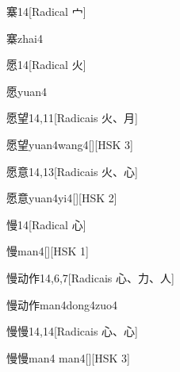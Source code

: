 \begin{entry}{寨}{14}[Radical ⼧]
  \begin{phonetics}{寨}{zhai4}
  \end{phonetics}
\end{entry}

\begin{entry}{愿}{14}[Radical ⽕]
  \begin{phonetics}{愿}{yuan4}
  \end{phonetics}
\end{entry}

\begin{entry}{愿望}{14,11}[Radicais ⽕、⽉]
  \begin{phonetics}{愿望}{yuan4wang4}[][HSK 3]
  \end{phonetics}
\end{entry}

\begin{entry}{愿意}{14,13}[Radicais ⽕、⼼]
  \begin{phonetics}{愿意}{yuan4yi4}[][HSK 2]
  \end{phonetics}
\end{entry}

\begin{entry}{慢}{14}[Radical ⼼]
  \begin{phonetics}{慢}{man4}[][HSK 1]
  \end{phonetics}
\end{entry}

\begin{entry}{慢动作}{14,6,7}[Radicais ⼼、⼒、⼈]
  \begin{phonetics}{慢动作}{man4dong4zuo4}
  \end{phonetics}
\end{entry}

\begin{entry}{慢慢}{14,14}[Radicais ⼼、⼼]
  \begin{phonetics}{慢慢}{man4 man4}[][HSK 3]
  \end{phonetics}
\end{entry}

